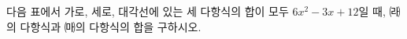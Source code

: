 다음 표에서 가로, 세로, 대각선에 있는 세 다항식의 합이 모두 $6x^2-3x+12$일 때, ㈑의 다항식과 ㈒의 다항식의 합을 구하시오.
\par\smallskip\begin{center}\resizebox{\ifdim\width>\linewidth\linewidth\else\width\fi}{!}{}\end{center}
